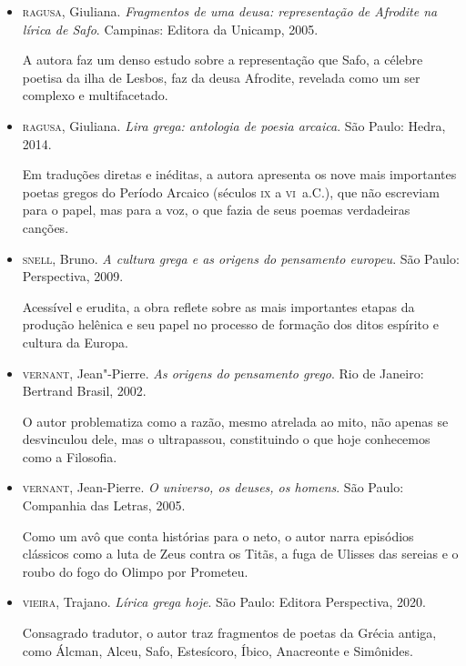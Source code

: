 \documentclass[12pt]{extarticle}
\begin{document}
\begin{itemize}
\item \textsc{ragusa}, Giuliana. \emph{Fragmentos de uma deusa: representação de
Afrodite na lírica de Safo}. Campinas: Editora da Unicamp, 2005. 

A autora faz um denso estudo sobre a representação que Safo, a célebre
poetisa da ilha de Lesbos, faz da deusa Afrodite, revelada como um ser
complexo e multifacetado.

\item \textsc{ragusa}, Giuliana. \emph{Lira grega: antologia de poesia arcaica}. São
Paulo: Hedra, 2014.

Em traduções diretas e inéditas, a autora apresenta os nove mais
importantes poetas gregos do Período Arcaico (séculos \textsc{ix} a \textsc{vi}~a.C.),
que não escreviam para o papel, mas para a voz, o que fazia de seus
poemas verdadeiras canções.

\item \textsc{snell}, Bruno. \emph{A cultura grega e as origens do pensamento
europeu}. São Paulo: Perspectiva, 2009.

Acessível e erudita, a obra reflete sobre as mais importantes etapas da
produção helênica e seu papel no processo de formação dos ditos espírito
e cultura da Europa.

\item \textsc{vernant}, Jean"-Pierre. \emph{As origens do pensamento grego}. Rio de
Janeiro: Bertrand Brasil, 2002.

O autor problematiza como a razão, mesmo atrelada ao mito, não apenas se
desvinculou dele, mas o ultrapassou, constituindo o que hoje conhecemos
como a Filosofia.

\item \textsc{vernant}, Jean-Pierre. \emph{O universo, os deuses, os homens}. São
Paulo: Companhia das Letras, 2005.

Como um avô que conta histórias para o neto, o autor narra episódios
clássicos como a luta de Zeus contra os Titãs, a fuga de Ulisses das
sereias e o roubo do fogo do Olimpo por Prometeu.

\item \textsc{vieira}, Trajano. \emph{Lírica grega hoje}. São Paulo: Editora
Perspectiva, 2020.

Consagrado tradutor, o autor traz fragmentos de poetas da Grécia
antiga, como Álcman, Alceu, Safo, Estesícoro, Íbico, Anacreonte e
Simônides.
\end{itemize}
\end{document}
